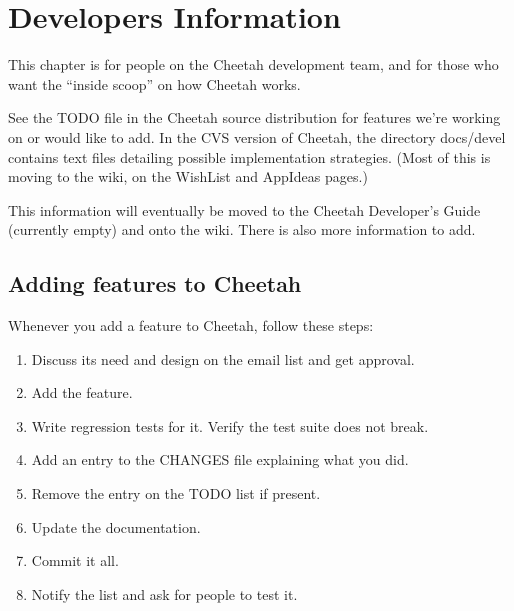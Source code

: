 \section{Developers Information}
\label{developer}

This chapter is for people on the Cheetah development team, and for those who
want the ``inside scoop'' on how Cheetah works.

See the TODO file in the Cheetah source distribution for features we're
working on or would like to add.  In the CVS version of Cheetah, the directory
docs/devel contains text files detailing possible implementation strategies.
(Most of this is moving to the wiki, on the WishList and AppIdeas pages.)

This information will eventually be moved to the Cheetah Developer's Guide
(currently empty) and onto the wiki.  There is also more information to add.


\subsection{Adding features to Cheetah}

Whenever you add a feature to Cheetah, follow these steps:

\begin{enumerate}
     
\item Discuss its need and design on the email list and get approval.
     
\item Add the feature.
     
\item Write regression tests for it.  Verify the test suite does not break.
     
\item Add an entry to the CHANGES file explaining what you did.
     
\item Remove the entry on the TODO list if present.
     
\item Update the documentation.
     
\item Commit it all.
     
\item Notify the list and ask for people to test it.

\end{enumerate}


